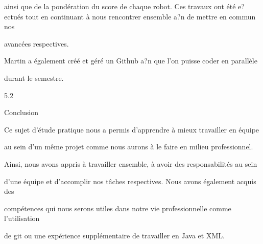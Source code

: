 \documentclass[a4paper,portrait,12pt]{article}
\begin{document}
\begin{flushleft}
ainsi que de la pond\'{e}ration du score de chaque robot. Ces travaux ont \'{e}t\'{e} e?ectu\'{e}s tout en continuant \`{a} nous rencontrer ensemble a?n de mettre en commun nos
\end{flushleft}


\begin{flushleft}
avanc\'{e}es respectives.
\end{flushleft}


\begin{flushleft}
Martin a \'{e}galement cr\'{e}\'{e} et g\'{e}r\'{e} un Github a?n que l'on puisse coder en parall\`{e}le
\end{flushleft}


\begin{flushleft}
durant le semestre.
\end{flushleft}


5.2





\begin{flushleft}
Conclusion
\end{flushleft}





\begin{flushleft}
Ce sujet d'\'{e}tude pratique nous a permis d'apprendre \`{a} mieux travailler en \'{e}quipe
\end{flushleft}


\begin{flushleft}
au sein d'un m\^{e}me projet comme nous aurons \`{a} le faire en milieu professionnel.
\end{flushleft}


\begin{flushleft}
Ainsi, nous avons appris \`{a} travailler ensemble, \`{a} avoir des responsabilit\'{e}s au sein
\end{flushleft}


\begin{flushleft}
d'une \'{e}quipe et d'accomplir nos t\^{a}ches respectives. Nous avons \'{e}galement acquis des
\end{flushleft}


\begin{flushleft}
comp\'{e}tences qui nous serons utiles dans notre vie professionnelle comme l'utilisation
\end{flushleft}


\begin{flushleft}
de git ou une exp\'{e}rience suppl\'{e}mentaire de travailler en Java et XML.
\end{flushleft}
\end{document}
